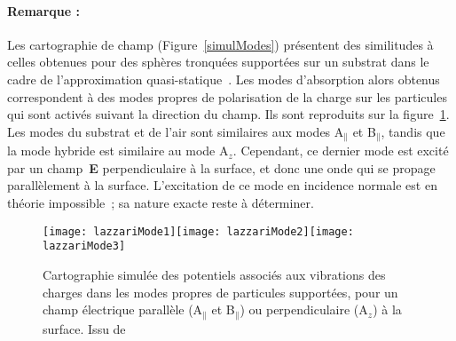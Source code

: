 \paragraph*{Remarque :} Les cartographie de champ (Figure~\ref{simulModes}) présentent des similitudes à celles obtenues pour des sphères tronquées supportées sur un substrat dans le cadre de l'approximation quasi-statique~\cite{Lazzari02d, lazzari03, lazzari14b}. Les modes d'absorption alors obtenus correspondent à des modes propres de polarisation de la charge sur les particules qui sont activés suivant la direction du champ. Ils sont reproduits sur la figure~\ref{lazzariModes}. Les modes du substrat et de l'air sont similaires aux modes A$_\parallel$ et B$_\parallel$, tandis que la mode hybride est similaire au mode A$_z$. Cependant, ce dernier mode est excité par un champ~\textbf{E} perpendiculaire à la surface, et donc une onde qui se propage parallèlement à la surface. L'excitation de ce mode en incidence normale est en théorie impossible~; sa nature exacte reste à déterminer.\par 
\begin{figure}[!htb]
\centering
\texttt{[image: lazzariMode1]}\texttt{[image: lazzariMode2]}\texttt{[image: lazzariMode3]}
\caption{Cartographie simulée des potentiels associés aux vibrations des charges dans les modes propres de particules supportées, pour un champ électrique parallèle (A$_\parallel$ et B$_\parallel$) ou perpendiculaire (A$_z$) à la surface. Issu de~\cite{lazzari14b}}
\label{lazzariModes}
\end{figure}
